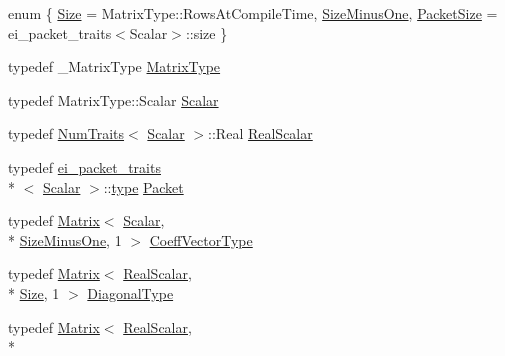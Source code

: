 \begin{DoxyCompactItemize}
\item 
enum \{ \hyperlink{class_tridiagonalization_a3689c5ded00bea1abc23f299a3a2190aa8c5d8707a645db9f17800f52ce809604}{Size} = Matrix\-Type\-:\-:Rows\-At\-Compile\-Time, 
\hyperlink{class_tridiagonalization_a3689c5ded00bea1abc23f299a3a2190aa73700bfd4b6c78591ad89b0ccbad3ea3}{Size\-Minus\-One}, 
\hyperlink{class_tridiagonalization_a3689c5ded00bea1abc23f299a3a2190aadc99f553fbae002450fc1099d959b66d}{Packet\-Size} = ei\-\_\-packet\-\_\-traits$<$Scalar$>$\-:\-:size
 \}
\item 
typedef \-\_\-\-Matrix\-Type \hyperlink{class_tridiagonalization_a527ab9a2b51075a625d5a7f1ef44b3c6}{Matrix\-Type}
\item 
typedef Matrix\-Type\-::\-Scalar \hyperlink{class_tridiagonalization_af2675cb1bbb7f8887cfd61322141a699}{Scalar}
\item 
typedef \hyperlink{struct_num_traits}{Num\-Traits}$<$ \hyperlink{class_tridiagonalization_af2675cb1bbb7f8887cfd61322141a699}{Scalar} $>$\-::Real \hyperlink{class_tridiagonalization_a8c7be80d039862e1f930e22332ba1064}{Real\-Scalar}
\item 
typedef \hyperlink{structei__packet__traits}{ei\-\_\-packet\-\_\-traits}\\*
$<$ \hyperlink{class_tridiagonalization_af2675cb1bbb7f8887cfd61322141a699}{Scalar} $>$\-::\hyperlink{glext_8h_a7d05960f4f1c1b11f3177dc963a45d86}{type} \hyperlink{class_tridiagonalization_a243d272d7194d42e8f1bdfa4df292568}{Packet}
\item 
typedef \hyperlink{class_matrix}{Matrix}$<$ \hyperlink{class_tridiagonalization_af2675cb1bbb7f8887cfd61322141a699}{Scalar}, \\*
\hyperlink{class_tridiagonalization_a3689c5ded00bea1abc23f299a3a2190aa73700bfd4b6c78591ad89b0ccbad3ea3}{Size\-Minus\-One}, 1 $>$ \hyperlink{class_tridiagonalization_aae368c68d55fd86aa74b45fe1124864d}{Coeff\-Vector\-Type}
\item 
typedef \hyperlink{class_matrix}{Matrix}$<$ \hyperlink{class_tridiagonalization_a8c7be80d039862e1f930e22332ba1064}{Real\-Scalar}, \\*
\hyperlink{class_tridiagonalization_a3689c5ded00bea1abc23f299a3a2190aa8c5d8707a645db9f17800f52ce809604}{Size}, 1 $>$ \hyperlink{class_tridiagonalization_a5ea34cf11c675c0a45c309aa7cb662b0}{Diagonal\-Type}
\item 
typedef \hyperlink{class_matrix}{Matrix}$<$ \hyperlink{class_tridiagonalization_a8c7be80d039862e1f930e22332ba1064}{Real\-Scalar}, \\*

\end{DoxyCompactItemize}
